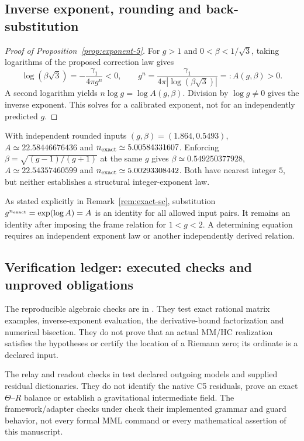 \subsection{Inverse exponent, rounding and back-substitution}
\label{app:inverse-exponent-check}

\begin{proof}[Proof of Proposition~\ref{prop:exponent-5}]
For $g>1$ and $0<\beta<1/\sqrt3$, taking logarithms of the
proposed correction law gives
\[
 \log(\beta\sqrt3)=-\frac{\gamma_1}{4\pi g^n}<0,
 \qquad g^n=\frac{\gamma_1}{4\pi|\log(\beta\sqrt3)|}=:A(g,\beta)>0.
\]
A second logarithm yields $n\log g=\log A(g,\beta)$.
Division by $\log g\ne0$ gives the inverse exponent. This solves
for a calibrated exponent, not for an independently predicted $g$.
\end{proof}

With independent rounded inputs $(g,\beta)=(1.864,0.5493)$,
$A\simeq22.58446676436$ and $n_{\rm exact}\simeq5.00584331607$.
Enforcing $\beta=\sqrt{(g-1)/(g+1)}$ at the same $g$ gives
$\beta\simeq0.549250377928$, $A\simeq22.54357460599$ and
$n_{\rm exact}\simeq5.00293308442$. Both have nearest integer $5$,
but neither establishes a structural integer-exponent law.

As stated explicitly in Remark~\ref{rem:exact-sc}, substitution
$g^{n_{\rm exact}}=\exp(\log A)=A$ is an identity for all allowed
input pairs. It remains an identity after imposing the frame relation
for $1<g<2$. A determining equation requires an independent exponent
law or another independently derived relation.

\subsection{Verification ledger: executed checks and unproved obligations}
\label{app:verification-ledger}

The reproducible algebraic checks are in
.
They test exact rational matrix examples, inverse-exponent evaluation,
the derivative-bound factorization and numerical bisection. They do
not prove that an actual MM/HC realization satisfies the hypotheses
or certify the location of a Riemann zero; its ordinate is a declared input.

The relay and readout checks in 
test declared outgoing models and supplied residual dictionaries.
They do not identify the native C5 residuals, prove an exact
$\Theta$--$R$ balance or establish a gravitational intermediate field.
The framework/adapter checks under 
check their implemented grammar and guard behavior, not every formal
MML command or every mathematical assertion of this manuscript.

